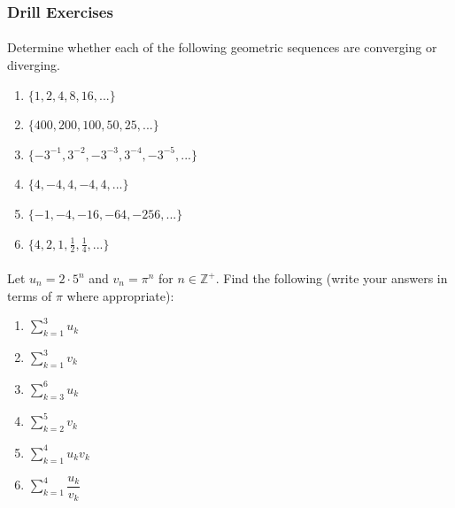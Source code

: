 \documentclass[12pt, a4paper, titlepage, twoside]{article}
\newcommand*{\Z}{\mathbb{Z}}
\begin{document}
	\hfill
	
	\subsubsection*{Drill Exercises}
	
	\paragraph{}
	 Determine whether each of the following geometric sequences are converging or diverging.
	
	\begin{multicols}{2}
		\begin{enumerate}[label=\textbf{(\alph*)}]
			\item $\{1, 2, 4, 8, 16,...\}$
			\item $\{400, 200, 100, 50, 25,...\}$
			\item $\{-3^{-1}, 3^{-2}, -3^{-3}, 3^{-4}, -3^{-5}, ...\}$
			\item $\{4, -4, 4, -4, 4,...\}$
			\item $\{-1, -4, -16, -64, -256,...\}$
			\item $\{4, 2, 1, \frac{1}{2}, \frac{1}{4}, ...\}$
		\end{enumerate}
	\end{multicols}
	
	\paragraph{}
	 Let $u_n = 2 \cdot 5^n$ and $v_n = \pi^n$ for $n \in \Z^+$. 
	Find the following (write your answers in terms of $\pi$ where appropriate):
	
	\begin{multicols}{2}
		\begin{enumerate}[label=\textbf{(\alph*)}]
			\item $\displaystyle \sum_{k=1}^3 u_k$
			\item $\displaystyle \sum_{k=1}^3 v_k$
			\item $\displaystyle \sum_{k=3}^6 u_k$
			\item $\displaystyle \sum_{k=2}^5 v_k$
			\item $\displaystyle \sum_{k=1}^{4} u_k v_k$
			\item $\displaystyle \sum_{k=1}^{4} \dfrac{u_k}{v_k}$
		\end{enumerate}
	\end{multicols}
	
\end{document}
